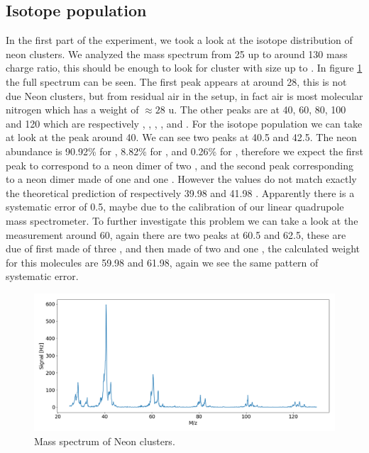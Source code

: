 \documentclass[a4paper,10pt]{article}
\begin{document}
\subsection{Isotope population}
In the first part of the experiment, we took a look at the isotope distribution of neon clusters. We analyzed the mass spectrum from 25 up to around 130 mass charge ratio, this should be enough to look for cluster with size up to . In figure \ref{isotopespectrum} the full spectrum can be seen. The first peak appears at around 28, this is not due Neon clusters, but from residual air in the setup, in fact air is most molecular nitrogen  which has a weight of $\approx 28$ u. The other peaks are at 40, 60, 80, 100 and 120 which are respectively , , , , and . For the isotope population we can take at look at the peak around 40. We can see two peaks at 40.5 and 42.5. The neon abundance is 90.92\% for , 8.82\% for , and 0.26\% for  \cite{script}, therefore we expect the first peak to correspond to a neon dimer of two , and the second peak corresponding to a neon dimer made of one  and one . However the values do not match exactly the theoretical prediction of respectively 39.98 and 41.98 \cite{umc}. Apparently there is a systematic error of 0.5, maybe due to the calibration of our linear quadrupole mass spectrometer. To further investigate this problem we can take a look at the measurement around 60, again there are two peaks at 60.5 and 62.5, these are due of  first made of three , and then made of two  and one , the calculated weight for this molecules are 59.98 and 61.98, again we see the same pattern of systematic error.

\begin{figure}[H]
	\centering
	\includegraphics[width =\textwidth]{isotopespectrum}
	\caption{Mass spectrum of Neon clusters.}
	\label{isotopespectrum}
\end{figure}
\end{document}
